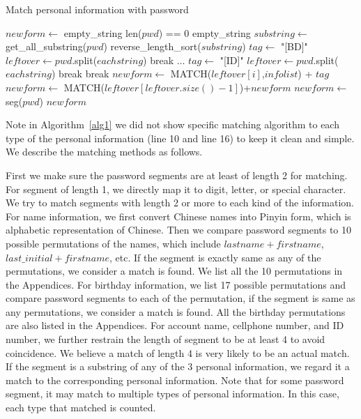 \documentclass{sig-alternate}
\begin{document}
\begin{algorithm}[h!]
\caption{Match personal information with password}
\label{alg1}
\begin{algorithmic}[1]
\State $newform \gets$ empty\_string
\If len($pwd$) == 0
\State \Return empty\_string
\EndIf
\State $substring \gets$ get\_all\_substring($pwd$)
\State reverse\_length\_sort($substring$)
\State $tag \gets $ "[BD]"
\State $leftover \gets pwd$.split($eachstring$)
\State break
\EndIf
\State $\ldots$
\State $tag \gets$ "[ID]"
\State $leftover \gets pwd$.split($eachstring$)
\State break
\EndIf
\Else
\State break
\EndIf
\EndFor
{}
\State $newform \gets$ MATCH($leftover[i]$,$infolist$) + $tag$
\EndFor
\State $newform \gets$  MATCH($leftover[leftover.size()-1]$)+$newform$
\Else
\State $newform \gets$ seg($pwd$)
\EndIf
\State \Return $newform$
\EndProcedure
\end{algorithmic}
\end{algorithm}

Note in Algorithm~\ref{alg1} we did not show specific matching algorithm to each type of the personal information (line 10 and line 16) to keep it clean and simple. We describe the matching methods as follows.

First we make sure the password segments are at least of length 2 for matching. For segment of length 1, we directly map it to digit, letter, or special character. We try to match segments with length 2 or more to each kind of the information. For name information, we first convert Chinese names into Pinyin form, which is alphabetic representation of Chinese. Then we compare password segments to 10 possible permutations of the names, which include $lastname + firstname$, $last\_initial+firstname$, etc. If the segment is exactly same as any of the permutations, we consider a match is found. We list all the 10 permutations in the Appendices. For birthday information, we list 17 possible permutations and compare password segments to each of the permutation, if the segment is same as any permutations, we consider a match is found. All the birthday permutations are also listed in the Appendices. For account name, cellphone number, and ID number, we further restrain the length of segment to be at least 4 to avoid coincidence. We believe a match of length 4 is very likely to be an actual match. If the segment is a substring of any of the 3 personal information, we regard it a match to the corresponding personal information. Note that for some password segment, it may match to multiple types of personal information. In this case, each type that matched is counted.
\end{document}
